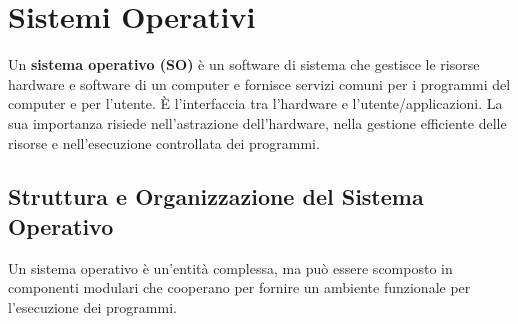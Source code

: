 \chapter{Sistemi Operativi}

Un \textbf{sistema operativo (SO)} è un software di sistema che gestisce le risorse hardware e software di un computer e fornisce servizi comuni per i programmi del computer e per l'utente. È l'interfaccia tra l'hardware e l'utente/applicazioni. La sua importanza risiede nell'astrazione dell'hardware, nella gestione efficiente delle risorse e nell'esecuzione controllata dei programmi.

\section{Struttura e Organizzazione del Sistema Operativo}
Un sistema operativo è un'entità complessa, ma può essere scomposto in componenti modulari che cooperano per fornire un ambiente funzionale per l'esecuzione dei programmi.

